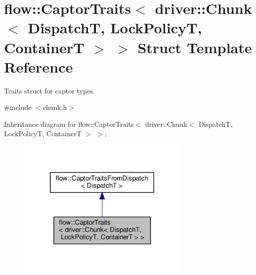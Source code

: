 \hypertarget{structflow_1_1_captor_traits_3_01driver_1_1_chunk_3_01_dispatch_t_00_01_lock_policy_t_00_01_container_t_01_4_01_4}{}\section{flow\+:\+:Captor\+Traits$<$ driver\+:\+:Chunk$<$ DispatchT, Lock\+PolicyT, ContainerT $>$ $>$ Struct Template Reference}
\label{structflow_1_1_captor_traits_3_01driver_1_1_chunk_3_01_dispatch_t_00_01_lock_policy_t_00_01_container_t_01_4_01_4}


Traits struct for captor types.  




{\ttfamily \#include $<$chunk.\+h$>$}



Inheritance diagram for flow\+:\+:Captor\+Traits$<$ driver\+:\+:Chunk$<$ DispatchT, Lock\+PolicyT, ContainerT $>$ $>$\+:\nopagebreak
\begin{figure}[H]
\begin{center}
\leavevmode
\includegraphics[width=236pt]{structflow_1_1_captor_traits_3_01driver_1_1_chunk_3_01_dispatch_t_00_01_lock_policy_t_00_01_cont2a133d89595bff68b930592e0989775c}
\end{center}
\end{figure}


